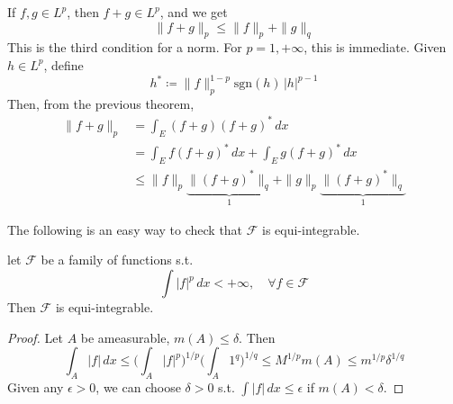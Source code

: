   \begin{theorem}[Minkowski]
    \label{thm:minkowski}
    If $f, g \in L^p$, then $f + g \in L^p$, and we get 
    \begin{equation}
      \| f + g \|_p \leq \|f\|_p + \|g\|_q
    \end{equation}
    This is the third condition for a norm. For $p = 1, +\infty$, this is immediate. Given $h \in L^p$, define 
    \begin{equation}
      h^\ast \coloneqq \|f\|_p^{1-p} \mathrm{sgn}(h) \, |h|^{p-1} 
    \end{equation}
    Then, from the previous theorem, 
    \begin{align}
      \| f + g \|_p & = \int_E (f + g)(f + g)^\ast \,dx  \\ 
                    & = \int_E f (f + g)^\ast \,dx + \int_E g (f + g)^\ast \,dx  \\ 
                    & \leq \|f\|_p \underbrace{\|(f + g)^\ast\|_q}_{1} + \|g\|_p \underbrace{\|(f + g)^\ast\|_q}_{1} 
    \end{align}
  \end{theorem}

  The following is an easy way to check that $\mathscr{F}$ is equi-integrable. 

  \begin{corollary}
    \label{thm:equi-integrability-of-a-bounded-family}
    let $\mathscr{F}$ be a family of functions s.t. 
    \begin{equation}
      \int |f|^p \,dx < +\infty, \quad \forall f \in \mathscr{F}
    \end{equation}
    Then $\mathscr{F}$ is equi-integrable. 
  \end{corollary}
  \begin{proof}
    Let $A$ be ameasurable, $m(A) \leq \delta$. Then 
    \begin{equation}
      \int_A |f| \,dx \leq \bigg( \int_A |f|^p \bigg)^{1/p} \bigg( \int_A 1^q \bigg)^{1/q} \leq M^{1/p} m(A) \leq m^{1/p} \delta^{1/q} 
    \end{equation}
    Given any $\epsilon > 0$, we can choose $\delta > 0$ s.t. $\int |f| \,dx \leq \epsilon$ if $m(A) < \delta$. 
  \end{proof}

